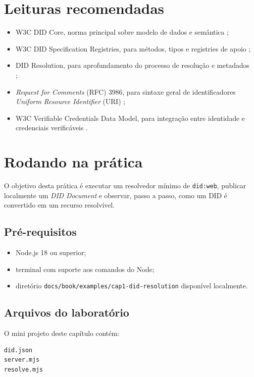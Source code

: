 \section{Leituras recomendadas}
\begin{itemize}[leftmargin=*]
  \item W3C DID Core, norma principal sobre modelo de dados e semântica \citep{w3c_did_core};
  \item W3C DID Specification Registries, para métodos, tipos e registries de apoio \citep{w3c_did_spec_registries};
  \item DID Resolution, para aprofundamento do processo de resolução e metadados \citep{w3c_did_resolution};
  \item \textit{Request for Comments} (RFC) 3986, para sintaxe geral de identificadores \textit{Uniform Resource Identifier} (URI) \citep{rfc3986};
  \item W3C Verifiable Credentials Data Model, para integração entre identidade e credenciais verificáveis \citep{w3c_vc_data_model}.
\end{itemize}

\section{Rodando na prática}
O objetivo desta prática é executar um resolvedor mínimo de \texttt{did:web}, publicar localmente um \textit{DID Document} e observar, passo a passo, como um DID é convertido em um recurso resolvível.

\subsection{Pré-requisitos}
\begin{itemize}[leftmargin=*]
  \item Node.js 18 ou superior;
  \item terminal com suporte aos comandos do Node;
  \item diretório \texttt{docs/book/examples/cap1-did-resolution} disponível localmente.
\end{itemize}

\subsection{Arquivos do laboratório}
O mini projeto deste capítulo contém:
\begin{verbatim}
did.json
server.mjs
resolve.mjs
\end{verbatim}

